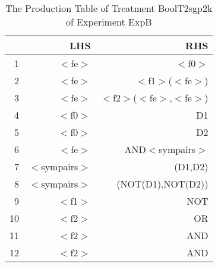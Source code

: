 \begin{table}[ht]
\centering
\begin{tabular}{rrr}
  \hline
 & LHS & RHS \\ 
  \hline
1 & $<$fe$>$ & $<$f0$>$ \\ 
  2 & $<$fe$>$ & $<$f1$>$($<$fe$>$) \\ 
  3 & $<$fe$>$ & $<$f2$>$($<$fe$>$,$<$fe$>$) \\ 
  4 & $<$f0$>$ & D1 \\ 
  5 & $<$f0$>$ & D2 \\ 
  6 & $<$fe$>$ & AND$<$sympairs$>$ \\ 
  7 & $<$sympairs$>$ & (D1,D2) \\ 
  8 & $<$sympairs$>$ & (NOT(D1),NOT(D2)) \\ 
  9 & $<$f1$>$ & NOT \\ 
  10 & $<$f2$>$ & OR \\ 
  11 & $<$f2$>$ & AND \\ 
  12 & $<$f2$>$ & AND \\ 
   \hline
\end{tabular}
\caption{The Production Table of Treatment BoolT2sgp2k of Experiment ExpB} 
\end{table}
